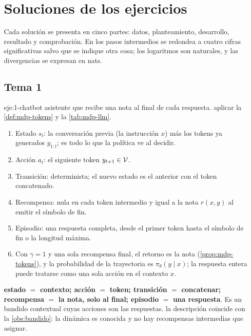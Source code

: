 \chapter{Soluciones de los ejercicios}
\label{ap:soluciones}

Cada solución se presenta en cinco partes: datos, planteamiento, desarrollo, resultado y comprobación. En los pasos intermedios se redondea a cuatro cifras significativas salvo que se indique otra cosa; los logaritmos son naturales, y las divergencias se expresan en nats.

\section{Tema 1}

\begin{solucion}{eje:1-chatbot}
\datos asistente que recibe una nota al final de cada respuesta.
\planteamiento aplicar la \cref{def:mdp-tokens} y la \cref{tab:mdp-llm}.
\pasos
\begin{enumerate}[label=\arabic*.]
  \item Estado $s_t$: la conversación previa (la instrucción $x$) más los tokens ya generados $y_{1:t}$; es todo lo que la política ve al decidir.
  \item Acción $a_t$: el siguiente token $y_{t+1}\in\mathcal{V}$.
  \item Transición: determinista; el nuevo estado es el anterior con el token concatenado.
  \item Recompensa: nula en cada token intermedio y igual a la nota $r(x,y)$ al emitir el símbolo de fin.
  \item Episodio: una respuesta completa, desde el primer token hasta el símbolo de fin o la longitud máxima.
  \item Con $\gamma=1$ y una sola recompensa final, el retorno es la nota (\cref{prop:mdp-tokens}), y la probabilidad de la trayectoria es $\pi_\theta(y\mid x)$; la respuesta entera puede tratarse como una sola acción en el contexto $x$.
\end{enumerate}
\resultado \textbf{estado $=$ contexto; acción $=$ token; transición $=$ concatenar; recompensa $=$ la nota, solo al final; episodio $=$ una respuesta}. Es un bandido contextual cuyas acciones son las respuestas.
\comprobacion la descripción coincide con la \cref{obs:bandido}: la dinámica es conocida y no hay recompensas intermedias que asignar.
\end{solucion}

